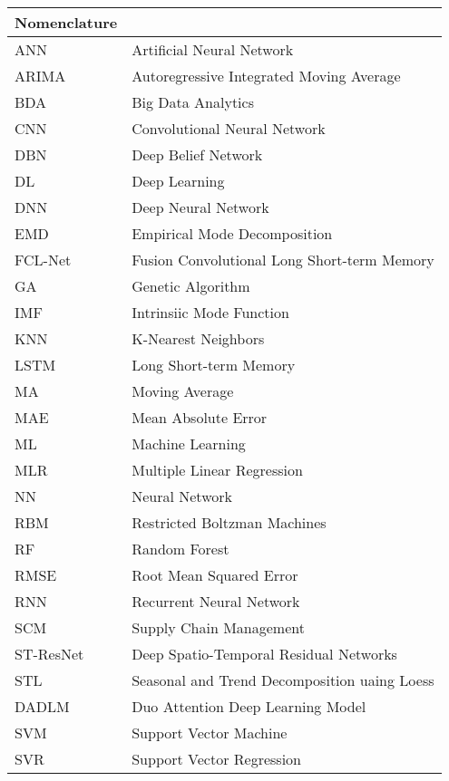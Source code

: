 \begin{tabular}{ ll } 
 Nomenclature & \\
 \hline\hline
ANN & Artificial Neural Network \\
ARIMA & Autoregressive Integrated Moving Average\\
BDA & Big Data Analytics\\
CNN & Convolutional Neural Network\\
DBN & Deep Belief Network\\
DL & Deep Learning\\
DNN & Deep Neural Network\\
EMD & Empirical Mode Decomposition \\
FCL-Net & Fusion Convolutional Long Short-term Memory\\
GA & Genetic Algorithm \\
IMF & Intrinsiic Mode Function \\
KNN & K-Nearest Neighbors\\
LSTM & Long Short-term Memory\\
MA & Moving Average\\
MAE & Mean Absolute Error\\
ML & Machine Learning\\
MLR & Multiple Linear Regression \\
NN & Neural Network\\
RBM & Restricted Boltzman Machines \\
RF & Random Forest\\
RMSE & Root Mean Squared Error\\
RNN & Recurrent Neural Network\\
SCM & Supply Chain Management\\
ST-ResNet & Deep Spatio-Temporal Residual Networks \\
STL & Seasonal and Trend Decomposition uaing Loess \\
DADLM & Duo Attention Deep Learning Model \\ 
SVM & Support Vector Machine\\
SVR & Support Vector Regression \\
\end{tabular}
